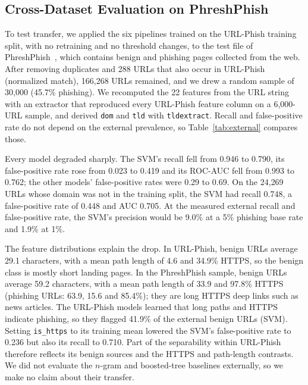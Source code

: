 \documentclass[conference]{IEEEtran}
\begin{document}
\subsection{Cross-Dataset Evaluation on PhreshPhish}
\label{sec:external}
To test transfer, we applied the six pipelines trained on the URL-Phish training split, with no retraining and no threshold changes, to the test file of PhreshPhish~\cite{dalton2025}, which contains benign and phishing pages collected from the web. After removing duplicates and 288 URLs that also occur in URL-Phish (normalized match), 166{,}268 URLs remained, and we drew a random sample of 30{,}000 (45.7\% phishing). We recomputed the 22 features from the URL string with an extractor that reproduced every URL-Phish feature column on a 6{,}000-URL sample, and derived \texttt{dom} and \texttt{tld} with \texttt{tldextract}. Recall and false-positive rate do not depend on the external prevalence, so Table~\ref{tab:external} compares those.

Every model degraded sharply. The SVM's recall fell from 0.946 to 0.790, its false-positive rate rose from 0.023 to 0.419 and its ROC-AUC fell from 0.993 to 0.762; the other models' false-positive rates were 0.29 to 0.69. On the 24{,}269 URLs whose domain was not in the training split, the SVM had recall 0.748, a false-positive rate of 0.448 and AUC 0.705. At the measured external recall and false-positive rate, the SVM's precision would be 9.0\% at a 5\% phishing base rate and 1.9\% at 1\%.

The feature distributions explain the drop. In URL-Phish, benign URLs average 29.1 characters, with a mean path length of 4.6 and 34.9\% HTTPS, so the benign class is mostly short landing pages. In the PhreshPhish sample, benign URLs average 59.2 characters, with a mean path length of 33.9 and 97.8\% HTTPS (phishing URLs: 63.9, 15.6 and 85.4\%); they are long HTTPS deep links such as news articles. The URL-Phish models learned that long paths and HTTPS indicate phishing, so they flagged 41.9\% of the external benign URLs (SVM). Setting \texttt{is\_https} to its training mean lowered the SVM's false-positive rate to 0.236 but also its recall to 0.710. Part of the separability within URL-Phish therefore reflects its benign sources and the HTTPS and path-length contrasts. We did not evaluate the $n$-gram and boosted-tree baselines externally, so we make no claim about their transfer.
\end{document}

